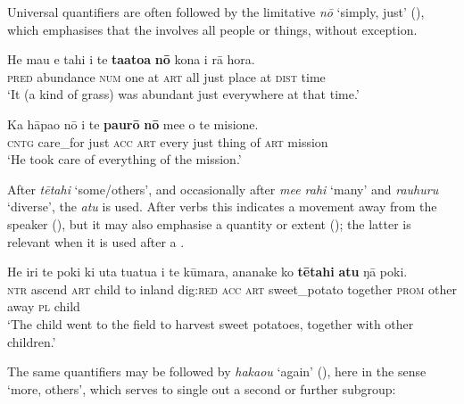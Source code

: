 Universal quantifiers are often followed by the limitative  \textit{nō} ‘simply, just’ (), which emphasises that the  involves all people or things, without exception.

\ea\label{ex:4.121}
\gll He mau e tahi {\ꞌ}i te \textbf{ta{\ꞌ}ato{\ꞌ}a} \textbf{nō} kona {\ꞌ}i rā hora. \\
\textsc{pred} abundance \textsc{num} one at \textsc{art} all just place at \textsc{dist} time \\

\glt 
‘It (a kind of grass) was abundant just everywhere at that time.’ \textstyleExampleref{[R106.050]} 
\z

\ea\label{ex:4.122}
\gll Ka hāpa{\ꞌ}o nō i te \textbf{paurō} \textbf{nō} me{\ꞌ}e o te misione. \\
\textsc{cntg} care\_for just \textsc{acc} \textsc{art} every just thing of \textsc{art} mission \\

\glt
‘He took care of everything of the mission.’ \textstyleExampleref{[R539-1.067]}
\z

After \textit{tētahi} ‘some/others’, and occasionally after \textit{me{\ꞌ}e rahi} ‘many’ and \textit{rauhuru} ‘diverse’, the   \textit{atu} is used. After verbs this  indicates a movement away from the speaker (), but it may also emphasise a quantity or extent (); the latter is relevant when it is used after a .

\ea\label{ex:4.123}
\gll He iri te poki ki {\ꞌ}uta tuatua i te kūmara,  ananake ko \textbf{tētahi} \textbf{atu} ŋā poki.\\
\textsc{ntr} ascend \textsc{art} child to inland dig:\textsc{red} \textsc{acc} \textsc{art} sweet\_potato  together \textsc{prom} other away \textsc{pl} child\\

\glt
‘The child went to the field to harvest sweet potatoes, together with other children.’ \textstyleExampleref{[Mtx-7-25.009]}
\z

The same quantifiers may be followed by \textit{haka{\ꞌ}ou} ‘again’ (), here in the sense ‘more, others’, which serves to single out a second or further subgroup:


